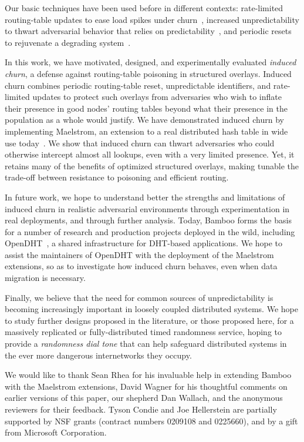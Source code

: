 \documentclass[10pt,twocolumn]{article}
\begin{document}
Our basic techniques have been used before in different contexts:
rate-limited routing-table updates to ease load spikes under
churn~\cite{Rhea2004}, increased unpredictability to thwart adversarial
behavior that relies on predictability~\cite{Kc2003}, and periodic
resets to rejuvenate a degrading system~\cite{Candea2004,Castro2000}.




In this work, we have motivated, designed, and experimentally evaluated
\emph{induced churn}, a defense against routing-table poisoning in structured
overlays.  Induced churn combines periodic routing-table reset,
unpredictable identifiers, and rate-limited updates to protect such
overlays from adversaries who wish to inflate their presence in good nodes'
routing tables beyond what their presence in the population as a
whole would justify.  We have demonstrated induced churn by implementing Maelstrom, an
extension to a real distributed hash table in wide use
today~\cite{Rhea2004}.
We show that induced churn can thwart adversaries who could otherwise intercept almost all
lookups, even with a very limited presence.
Yet, it retains many of the benefits of optimized structured
overlays, making tunable the trade-off between resistance to poisoning and efficient routing.

In future work, we hope to understand better the strengths and
limitations of induced churn in realistic adversarial environments
through experimentation in real deployments, and through further analysis.
Today, Bamboo forms the basis for a number of research and production projects
deployed in the wild, including OpenDHT~\cite{Rhea2005}, a shared
infrastructure for DHT-based applications.  We hope to assist the
maintainers of OpenDHT with the deployment of the Maelstrom extensions,
so as to investigate how induced churn behaves, even when data migration
is necessary.

Finally, we believe that the need for common sources of unpredictability
is becoming increasingly important in loosely coupled distributed
systems.  We hope to study further designs proposed in the
literature, or those proposed here, for a massively replicated or
fully-distributed timed randomness
service, hoping to provide a \emph{randomness dial tone} that can help
safeguard distributed systems in the ever more
dangerous internetworks they occupy.


We would like to thank Sean Rhea for his invaluable help in extending
Bamboo with the Maelstrom extensions, David Wagner for his
thoughtful comments on earlier versions of this paper, our shepherd Dan
Wallach, and the anonymous
reviewers for their feedback.  Tyson Condie and Joe Hellerstein are
partially supported by NSF grants (contract numbers 0209108 and
0225660), and by a gift from Microsoft Corporation.




%

\end{document}
